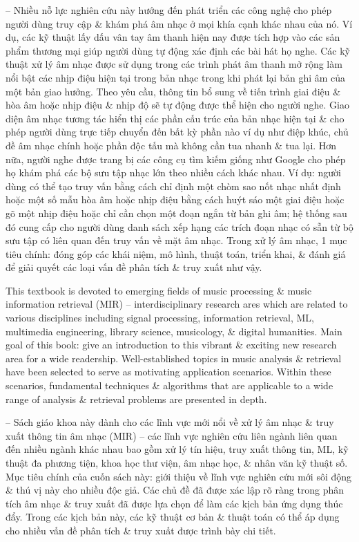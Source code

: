 \documentclass{article}
\begin{document}
\begin{itemize}
	-- Nhiều nỗ lực nghiên cứu này hướng đến phát triển các công nghệ cho phép người dùng truy cập \& khám phá âm nhạc ở mọi khía cạnh khác nhau của nó. Ví dụ, các kỹ thuật lấy dấu vân tay âm thanh hiện nay được tích hợp vào các sản phẩm thương mại giúp người dùng tự động xác định các bài hát họ nghe. Các kỹ thuật xử lý âm nhạc được sử dụng trong các trình phát âm thanh mở rộng làm nổi bật các nhịp điệu hiện tại trong bản nhạc trong khi phát lại bản ghi âm của một bản giao hưởng. Theo yêu cầu, thông tin bổ sung về tiến trình giai điệu \& hòa âm hoặc nhịp điệu \& nhịp độ sẽ tự động được thể hiện cho người nghe. Giao diện âm nhạc tương tác hiển thị các phần cấu trúc của bản nhạc hiện tại \& cho phép người dùng trực tiếp chuyển đến bất kỳ phần nào ví dụ như điệp khúc, chủ đề âm nhạc chính hoặc phần độc tấu mà không cần tua nhanh \& tua lại. Hơn nữa, người nghe được trang bị các công cụ tìm kiếm giống như Google cho phép họ khám phá các bộ sưu tập nhạc lớn theo nhiều cách khác nhau. Ví dụ: người dùng có thể tạo truy vấn bằng cách chỉ định một chòm sao nốt nhạc nhất định hoặc một số mẫu hòa âm hoặc nhịp điệu bằng cách huýt sáo một giai điệu hoặc gõ một nhịp điệu hoặc chỉ cần chọn một đoạn ngắn từ bản ghi âm; hệ thống sau đó cung cấp cho người dùng danh sách xếp hạng các trích đoạn nhạc có sẵn từ bộ sưu tập có liên quan đến truy vấn về mặt âm nhạc. Trong xử lý âm nhạc, 1 mục tiêu chính: đóng góp các khái niệm, mô hình, thuật toán, triển khai, \& đánh giá để giải quyết các loại vấn đề phân tích \& truy xuất như vậy.
	
	This textbook is devoted to emerging fields of music processing \& music information retrieval (MIR) -- interdisciplinary research ares which are related to various disciplines including signal processing, information retrieval, ML, multimedia engineering, library science, musicology, \& digital humanities. Main goal of this book: give an introduction to this vibrant \& exciting new research area for a wide readership. Well-established topics in music analysis \& retrieval have been selected to serve as motivating application scenarios. Within these scenarios, fundamental techniques \& algorithms that are applicable to a wide range of analysis \& retrieval problems are presented in depth.
	
	-- Sách giáo khoa này dành cho các lĩnh vực mới nổi về xử lý âm nhạc \& truy xuất thông tin âm nhạc (MIR) -- các lĩnh vực nghiên cứu liên ngành liên quan đến nhiều ngành khác nhau bao gồm xử lý tín hiệu, truy xuất thông tin, ML, kỹ thuật đa phương tiện, khoa học thư viện, âm nhạc học, \& nhân văn kỹ thuật số. Mục tiêu chính của cuốn sách này: giới thiệu về lĩnh vực nghiên cứu mới sôi động \& thú vị này cho nhiều độc giả. Các chủ đề đã được xác lập rõ ràng trong phân tích âm nhạc \& truy xuất đã được lựa chọn để làm các kịch bản ứng dụng thúc đẩy. Trong các kịch bản này, các kỹ thuật cơ bản \& thuật toán có thể áp dụng cho nhiều vấn đề phân tích \& truy xuất được trình bày chi tiết.
	

\end{itemize}
\end{document}
